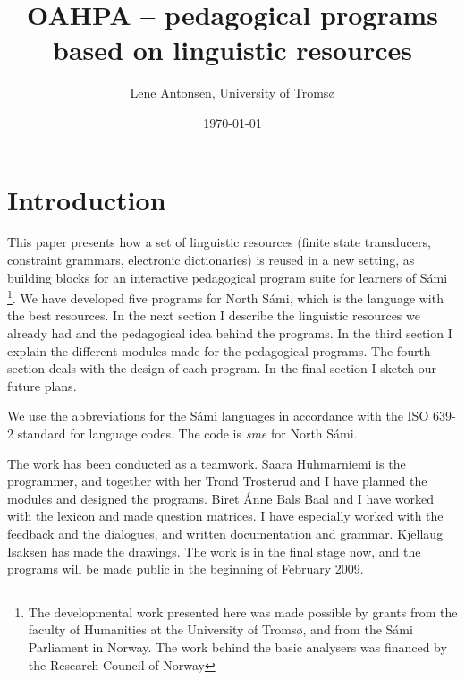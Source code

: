 \documentclass[a4paper,12pt]{article}
\begin{document}
\title{OAHPA -- pedagogical programs based on linguistic resources}

\author{Lene Antonsen, University of Tromsø}
\date{\today}
\maketitle
{}
 
\maketitle
\tableofcontents


\section{Introduction}
This paper presents how a set of linguistic resources (finite state transducers, constraint grammars, electronic dictionaries) is reused in a new setting, as building blocks for an interactive pedagogical program suite for learners of Sámi \footnote{The developmental work presented here was made possible by grants from the faculty of Humanities at the University of Tromsø, and from the Sámi Parliament in Norway. The work behind the basic analysers was financed by the Research Council of Norway}. 
We have developed five programs for North Sámi, which is the language with the best resources. In the next section I describe the linguistic resources we already had and the pedagogical idea behind the programs. In the third section I explain the different modules made for the pedagogical programs. The fourth section deals with the design of each program. In the final section I sketch our future plans.

We use the abbreviations for the Sámi languages in accordance with the ISO 639-2 standard for language codes. The code is \textit{sme} for North Sámi. 

The work has been conducted as a teamwork. Saara Huhmarniemi is the programmer, and together with her Trond Trosterud and I have planned the modules and designed the programs. Biret Ánne Bals Baal and I have worked with the lexicon and made question matrices. I have especially worked with the feedback and the dialogues, and written documentation and grammar. Kjellaug Isaksen has made the drawings. The work is in the final stage now, and the programs will be made public in the beginning of February 2009. 
\end{document}
